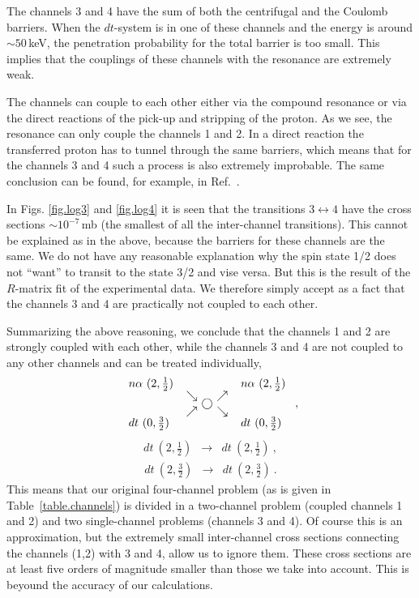 \documentclass[12pt]{article}
\begin{document}
The channels 3 and 4 have the sum of both the centrifugal and the Coulomb
barriers. When the $dt$-system is in one of these channels and the energy is
around $\sim50$\,keV, the penetration probability for the total barrier is too
small. This implies that the couplings of these channels with the resonance are
extremely weak.

The channels can couple to each other either via the compound resonance or via
the direct reactions of the pick-up and stripping of the proton. As we see, the
resonance can only couple the channels 1 and 2. In a direct reaction the
transferred proton has to tunnel through the same barriers, which means that for
the channels 3 and 4 such a process is also extremely improbable. The same
conclusion can be found, for example, in Ref.~\cite{Melezhik}.

In Figs. \ref{fig.log3} and \ref{fig.log4} it is seen that the transitions
$3\leftrightarrow4$ have the cross sections $\sim10^{-7}$\,mb (the smallest of
all the inter-channel transitions). This cannot be explained as in the above,
because the barriers for these channels are the same. We do not have any
reasonable explanation why the spin state 1/2 does not ``want'' to transit to
the state 3/2 and vise versa. But this is the result of the $R$-matrix fit of
the experimental data. We therefore simply accept as a fact that the channels 3
and 4 are practically not coupled to each other.

Summarizing the above reasoning, we conclude that the channels 1 and 2 are
strongly coupled with each other, while the channels 3 and 4 are not coupled to
any other channels and can be treated individually,
\begin{equation}
\label{couplings12}
\begin{array}{lcl}
   n\alpha\ (2,\frac12) &  & n\alpha\ (2,\frac12)\\
   & \displaystyle\genfrac{}{}{0pt}{}{\searrow}{\nearrow}
   \bigcirc
     \displaystyle\genfrac{}{}{0pt}{}{\nearrow}{\searrow}
   & \\
   dt\ (0,\frac32) &  & dt\ (0,\frac32)\\
\end{array}\ ,
\end{equation}
\begin{eqnarray}
\label{couplings3}
   dt\ (2,\textstyle\frac12) & \longrightarrow & dt\ (2,\textstyle\frac12)\ ,
\end{eqnarray}
\begin{eqnarray}
\label{couplings4}
   dt\ (2,\textstyle\frac32) & \longrightarrow & dt\ (2,\textstyle\frac32)\ .
\end{eqnarray}
This means that our original four-channel problem (as is given in
Table~\ref{table.channels}) is divided in a two-channel problem (coupled
channels 1 and 2) and two single-channel problems (channels 3 and 4). Of course
this is an approximation, but the extremely small
inter-channel cross sections connecting the channels (1,2) with 3 and 4, allow
us to ignore them. These cross sections are at least five orders of magnitude
smaller than those we take into account. This is beyound the accuracy of our
calculations.
\end{document}
